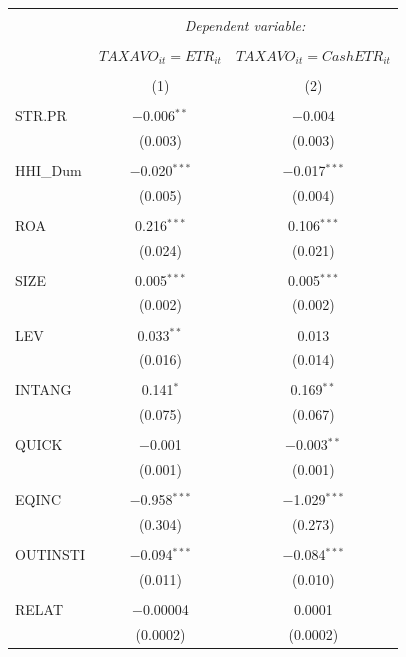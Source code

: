 \documentclass[a4paper]{article}\usepackage[]{graphicx}\usepackage[]{color}
\begin{document}
\begin{table}[!htbp] \centering 
  \caption{} 
  \label{F1} 
\begin{tabular}{@{\extracolsep{5pt}}lcc} 
\\[-1.8ex]\hline 
\hline \\[-1.8ex] 
 & \multicolumn{2}{c}{\textit{Dependent variable:}} \\ 
\cline{2-3} 
\\[-1.8ex] & $TAXAVO_{it}=ETR_{it}$ & $TAXAVO_{it}=CashETR_{it}$ \\ 
\\[-1.8ex] & (1) & (2)\\ 
\hline \\[-1.8ex] 
 STR.PR & $-$0.006$^{**}$ & $-$0.004 \\ 
  & (0.003) & (0.003) \\ 
  & & \\ 
 HHI\_Dum & $-$0.020$^{***}$ & $-$0.017$^{***}$ \\ 
  & (0.005) & (0.004) \\ 
  & & \\ 
 ROA & 0.216$^{***}$ & 0.106$^{***}$ \\ 
  & (0.024) & (0.021) \\ 
  & & \\ 
 SIZE & 0.005$^{***}$ & 0.005$^{***}$ \\ 
  & (0.002) & (0.002) \\ 
  & & \\ 
 LEV & 0.033$^{**}$ & 0.013 \\ 
  & (0.016) & (0.014) \\ 
  & & \\ 
 INTANG & 0.141$^{*}$ & 0.169$^{**}$ \\ 
  & (0.075) & (0.067) \\ 
  & & \\ 
 QUICK & $-$0.001 & $-$0.003$^{**}$ \\ 
  & (0.001) & (0.001) \\ 
  & & \\ 
 EQINC & $-$0.958$^{***}$ & $-$1.029$^{***}$ \\ 
  & (0.304) & (0.273) \\ 
  & & \\ 
 OUTINSTI & $-$0.094$^{***}$ & $-$0.084$^{***}$ \\ 
  & (0.011) & (0.010) \\ 
  & & \\ 
 RELAT & $-$0.00004 & 0.0001 \\ 
  & (0.0002) & (0.0002) \\ 

\end{tabular}
\end{table}
\end{document}
